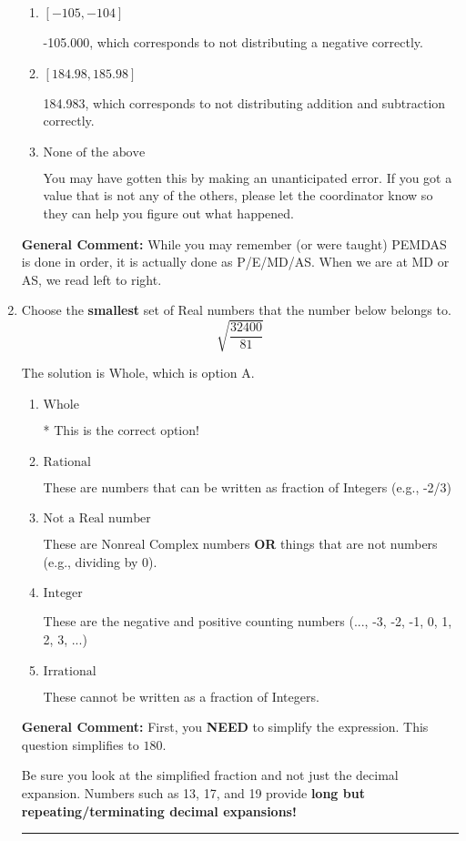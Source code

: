 \documentclass{extbook}[14pt]
\newcommand{\litem}[1]{\item #1

\rule{\textwidth}{0.4pt}}
\begin{document}
\begin{enumerate}
{\begin{enumerate}[label=\Alph*.]
* -163.667, which is the correct option.
\item \( [-105, -104] \)

 -105.000, which corresponds to not distributing a negative correctly.
\item \( [184.98, 185.98] \)

 184.983, which corresponds to not distributing addition and subtraction correctly.
\item \( \text{None of the above} \)

 You may have gotten this by making an unanticipated error. If you got a value that is not any of the others, please let the coordinator know so they can help you figure out what happened.
\end{enumerate}

\textbf{General Comment:} While you may remember (or were taught) PEMDAS is done in order, it is actually done as P/E/MD/AS. When we are at MD or AS, we read left to right.
}
\litem{
Choose the \textbf{smallest} set of Real numbers that the number below belongs to.
\[ \sqrt{\frac{32400}{81}} \]

The solution is \( \text{Whole} \), which is option A.\begin{enumerate}[label=\Alph*.]
\item \( \text{Whole} \)

* This is the correct option!
\item \( \text{Rational} \)

These are numbers that can be written as fraction of Integers (e.g., -2/3)
\item \( \text{Not a Real number} \)

These are Nonreal Complex numbers \textbf{OR} things that are not numbers (e.g., dividing by 0).
\item \( \text{Integer} \)

These are the negative and positive counting numbers (..., -3, -2, -1, 0, 1, 2, 3, ...)
\item \( \text{Irrational} \)

These cannot be written as a fraction of Integers.
\end{enumerate}

\textbf{General Comment:} First, you \textbf{NEED} to simplify the expression. This question simplifies to $180$. 
 
 Be sure you look at the simplified fraction and not just the decimal expansion. Numbers such as 13, 17, and 19 provide \textbf{long but repeating/terminating decimal expansions!} 
 
}
\end{enumerate}
\end{document}
